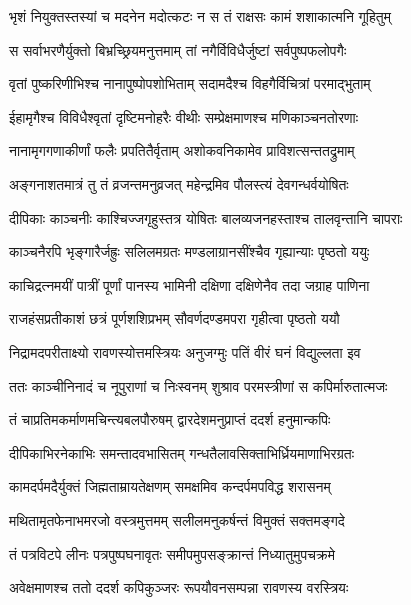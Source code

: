 \twolineshloka
{भृशं नियुक्तस्तस्यां च मदनेन मदोत्कटः}
{न स तं राक्षसः कामं शशाकात्मनि गूहितुम्} %

\twolineshloka
{स सर्वाभरणैर्युक्तो बिभ्रच्छ्रियमनुत्तमाम्}
{तां नगैर्विविधैर्जुष्टां सर्वपुष्पफलोपगैः} %

\twolineshloka
{वृतां पुष्करिणीभिश्च नानापुष्पोपशोभिताम्}
{सदामदैश्च विहगैर्विचित्रां परमाद्भुताम्} %

\twolineshloka
{ईहामृगैश्च विविधैश्वृतां दृष्टिमनोहरैः}
{वीथीः सम्प्रेक्षमाणश्च मणिकाञ्चनतोरणाः} %

\twolineshloka
{नानामृगगणाकीर्णां फलैः प्रपतितैर्वृताम्}
{अशोकवनिकामेव प्राविशत्सन्ततद्रुमाम्} %

\twolineshloka
{अङ्गनाशतमात्रं तु तं व्रजन्तमनुव्रजत्}
{महेन्द्रमिव पौलस्त्यं देवगन्धर्वयोषितः} %

\twolineshloka
{दीपिकाः काञ्चनीः काश्चिज्जगृहुस्तत्र योषितः}
{बालव्यजनहस्ताश्च तालवृन्तानि चापराः} %

\twolineshloka
{काञ्चनैरपि भृङ्गारैर्जह्रुः सलिलमग्रतः}
{मण्डलाग्रानसींश्चैव गृह्यान्याः पृष्ठतो ययुः} %

\twolineshloka
{काचिद्रत्नमयीं पात्रीं पूर्णां पानस्य भामिनी}
{दक्षिणा दक्षिणेनैव तदा जग्राह पाणिना} %

\twolineshloka
{राजहंसप्रतीकाशं छत्रं पूर्णशशिप्रभम्}
{सौवर्णदण्डमपरा गृहीत्वा पृष्ठतो ययौ} %

\twolineshloka
{निद्रामदपरीताक्ष्यो रावणस्योत्तमस्त्रियः}
{अनुजग्मुः पतिं वीरं घनं विद्युल्लता इव} %

\twolineshloka
{ततः काञ्चीनिनादं च नूपुराणां च निःस्वनम्}
{शुश्राव परमस्त्रीणां स कपिर्मारुतात्मजः} %

\twolineshloka
{तं चाप्रतिमकर्माणमचिन्त्यबलपौरुषम्}
{द्वारदेशमनुप्राप्तं ददर्श हनुमान्कपिः} %

\twolineshloka
{दीपिकाभिरनेकाभिः समन्तादवभासितम्}
{गन्धतैलावसिक्ताभिर्ध्रियमाणाभिरग्रतः} %

\twolineshloka
{कामदर्पमदैर्युक्तं जिह्मताम्रायतेक्षणम्}
{समक्षमिव कन्दर्पमपविद्ध शरासनम्} %

\twolineshloka
{मथितामृतफेनाभमरजो वस्त्रमुत्तमम्}
{सलीलमनुकर्षन्तं विमुक्तं सक्तमङ्गदे} %

\twolineshloka
{तं पत्रविटपे लीनः पत्रपुष्पघनावृतः}
{समीपमुपसङ्क्रान्तं निध्यातुमुपचक्रमे} %

\twolineshloka
{अवेक्षमाणश्च ततो ददर्श कपिकुञ्जरः}
{रूपयौवनसम्पन्ना रावणस्य वरस्त्रियः} %

